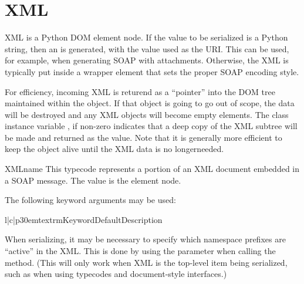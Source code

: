 \section{XML}

XML is a Python DOM element node.
If the value to be serialized is a Python string, then an 
is generated, with the value used as the URI.
This can be used, for example, when generating SOAP with attachments.
Otherwise, the XML is typically put inside a wrapper element that sets
the proper SOAP encoding style.

For efficiency, incoming XML is returend as a ``pointer'' into the
DOM tree maintained within the  object.
If that object is going to go out of scope, the data will be destroyed
and any XML objects will become empty elements.
The class instance variable , if non-zero indicates that a
deep copy of the XML subtree will be made and returned as the value.
Note that it is generally more efficient to keep the 
object alive until the XML data is no longerneeded.

\begin{classdesc}{XML}{name}
This typecode represents a portion of an XML document embedded in a SOAP
message.
The value is the element node.

The following keyword arguments may be used:

\begin{tableiii}{l|c|p{30em}}{textrm}{Keyword}{Default}{Description}
\end{tableiii}
\end{classdesc}

When serializing, it may be necessary to specify which namespace prefixes
are ``active'' in the XML.
This is done by using the  parameter when
calling the  method.
(This will only work when XML is the top-level item being serialized,
such as when using typecodes and document-style interfaces.)

